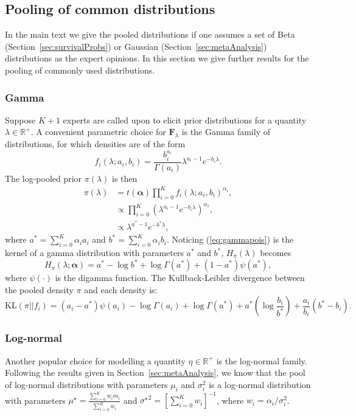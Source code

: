 \documentclass[12pt]{article}
\begin{document}
\newpage
\subsection{Pooling of common distributions}
\label{sec:appendix_common_poolings}

In the main text we give the pooled distributions if one assumes a set of Beta (Section~\ref{sec:survivalProbs}) or Gaussian (Section~\ref{sec:metaAnalysis}) distributions as the expert opinions.
In this section we give further results for the pooling of commonly used distributions.

\subsubsection{Gamma}
\label{sec:gamma}
Suppose $K + 1$ experts are called upon to elicit prior distributions for a quantity $\lambda \in \mathbb{R}^+$.
A convenient parametric choice for $\mathbf{F}_\lambda$ is the Gamma family of distributions, for which densities are of the form
$$ f_i(\lambda;a_i,b_i) = \frac{b_i^{a_i}}{\Gamma(a_i)} \lambda^{a_i-1} e^{-b_i\lambda}.$$
The log-pooled prior $\pi(\lambda)$ is then
\begin{align}
\nonumber
\pi(\lambda)&= t(\boldsymbol\alpha)\prod_{i=0}^{K}f_i(\lambda;a_i,b_i)^{\alpha_i},\\
\nonumber
&\propto \prod_{i=0}^{K} \left(\lambda^{a_i-1} e^{-b_i\lambda}\right)^{\alpha_i},\\
\label{eq:gammapois}
&\propto \lambda^{a^*-1} e^{-b^*\lambda},
\end{align}
where $a^* =\sum_{i=0}^{K}\alpha_ia_i$ and $b^* = \sum_{i=0}^{K}\alpha_ib_i$.
Noticing (\ref{eq:gammapois}) is the kernel of a gamma distribution with parameters $a^*$ and $b^*$, $H_{\pi}(\lambda)$ becomes
\begin{equation}
\label{eq:entropygamma}
H_{\pi}(\lambda; \boldsymbol\alpha) = a^* - \log b^* + \log \Gamma(a^*) + (1-a^*)\psi(a^*),
\end{equation}
where $\psi(\cdot)$ is the digamma function.
The Kullback-Leibler divergence between the pooled density $\pi$ and each density is:
\begin{equation}
 \label{eq:KLgamma}
 \text{KL}(\pi || f_i) = (a_i-a^*)\psi(a_i) - \log\Gamma(a_i) + \log\Gamma(a^*) + a^*\left(\log\frac{b_i}{b^*}\right) + \frac{a_i}{b_i}(b^*-b_i).
\end{equation}

\subsubsection{Log-normal} 
\label{sec:log-normal}
Another popular choice for modelling a quantity $\eta \in \mathbb{R}^+$ is the log-normal family.
Following the results given in Section~\ref{sec:metaAnalysis}, we know that the pool of log-normal distributions with parameters $\mu_i$ and $\sigma_i^2$ is a log-normal distribution with parameters $\mu^\star = \frac{\sum_{i=0}^K w_im_i}{\sum_{i=0}^K w_i}$ and ${\sigma^\star}^2 = [\sum_{i=0}^K w_i]^{-1}$,  where $w_i = \alpha_i/\sigma_i^2$.
\end{document}
